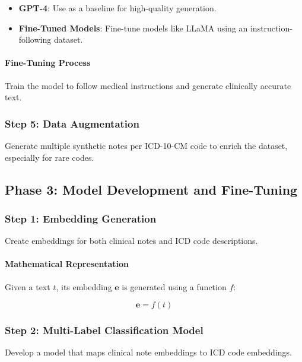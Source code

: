 \documentclass[12pt, a4paper]{article}
\begin{document}
\begin{itemize}
    \item \textbf{GPT-4}: Use as a baseline for high-quality generation.
    \item \textbf{Fine-Tuned Models}: Fine-tune models like LLaMA using an instruction-following dataset.
\end{itemize}

\paragraph{Fine-Tuning Process}

Train the model to follow medical instructions and generate clinically accurate text.

\subsubsection{Step 5: Data Augmentation}

Generate multiple synthetic notes per ICD-10-CM code to enrich the dataset, especially for rare codes.

\subsection{Phase 3: Model Development and Fine-Tuning}

\subsubsection{Step 1: Embedding Generation}

Create embeddings for both clinical notes and ICD code descriptions.

\paragraph{Mathematical Representation}

Given a text \( t \), its embedding \( \mathbf{e} \) is generated using a function \( f \):

\begin{equation}
\mathbf{e} = f(t)
\end{equation}

\subsubsection{Step 2: Multi-Label Classification Model}

Develop a model that maps clinical note embeddings to ICD code embeddings.
\end{document}
